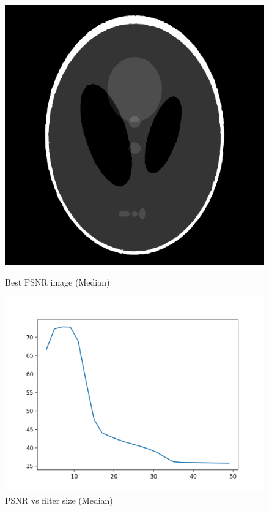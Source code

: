\documentclass{article}
\begin{document}
    \begin{figure}[!htb]
      \includegraphics[scale=0.3]{./basic_denoising/shepplogan/median_best_sp.png}
      \caption{Best PSNR image (Median)}
    \endminipage \hfill
      \includegraphics[scale=.45]{./basic_denoising/shepplogan/median_psnr_sp.png}
      \caption{PSNR vs filter size (Median)}
    \endminipage
    \end{figure}
    \pagebreak
\end{document}
